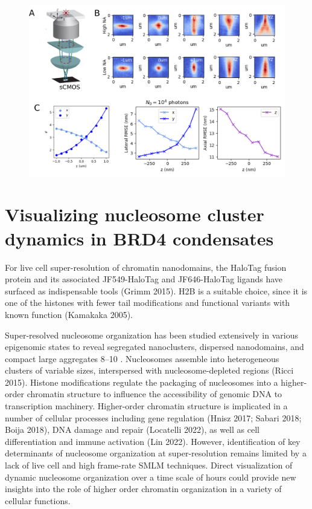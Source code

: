 \documentclass{ucetd}
\begin{document}
\begin{figure}
\begin{center}
\includegraphics[width=16cm]{Astigmatism.png}
\end{center}
\end{figure}

\section{Visualizing nucleosome cluster dynamics in BRD4 condensates}

For live cell super-resolution of chromatin nanodomains, the HaloTag fusion protein and its associated JF549-HaloTag and JF646-HaloTag ligands have surfaced as indispensable tools (Grimm 2015). H2B is a suitable choice, since it is one of the histones with fewer tail modifications and functional variants with known function (Kamakaka 2005).

Super-resolved nucleosome organization has been studied extensively in various epigenomic states to reveal segregated nanoclusters, dispersed nanodomains, and compact large aggregates  8–10 . Nucleosomes assemble into heterogeneous clusters of variable sizes, interspersed with nucleosome-depleted regions (Ricci 2015). Histone modiﬁcations regulate the packaging of nucleosomes into a higher-order chromatin structure to inﬂuence the accessibility of genomic DNA to transcription machinery. Higher-order chromatin structure is implicated in a number of cellular processes including gene regulation (Hnisz 2017; Sabari 2018; Boija 2018), DNA damage and repair (Locatelli 2022), as well as cell differentiation and immune activation (Lin 2022). However, identification of key determinants of nucleosome organization at super-resolution remains limited by a lack of live cell and high frame-rate SMLM techniques. Direct visualization of dynamic nucleosome organization over a time scale of hours could provide new insights into the role of higher order chromatin organization in a variety of cellular functions.  
\end{document}
